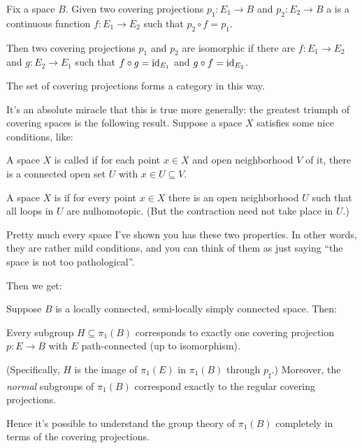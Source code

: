 \begin{definition}
	Fix a space $B$.
	Given two covering projections $p_1 \colon E_1 \to B$ and $p_2 \colon E_2 \to B$
	a  is a continuous function $f \colon E_1 \to E_2$
	such that $p_2 \circ f = p_1$.
	\begin{center}
	\end{center}
	Then two covering projections $p_1$ and $p_2$ are isomorphic if there are
	$f \colon E_1 \to E_2$ and $g \colon E_2 \to E_1$
	such that $f \circ g = \mathrm{id}_{E_1}$ and $g \circ f = \mathrm{id}_{E_2}$.
\end{definition}
\begin{remark}
	The set of covering projections forms a category in this way.
\end{remark}

It's an absolute miracle that this is true more generally:
the greatest triumph of covering spaces is the following result.
Suppose a space $X$ satisfies some nice conditions, like:
\begin{definition}
	A space $X$ is called 
	if for each point $x \in X$ and open neighborhood $V$ of it,
	there is a connected open set $U$ with $x \in U \subseteq V$.
\end{definition}
\begin{definition}
	A space $X$ is 
	if for every point $x \in X$
	there is an open neighborhood $U$
	such that all loops in $U$ are nulhomotopic.
	(But the contraction need not take place in $U$.)
\end{definition}
\begin{example}
	Pretty much every space I've shown you has these two properties.
	In other words, they are rather mild conditions, and you can think of them as just
	saying ``the space is not too pathological''.
\end{example}
Then we get:
\begin{theorem}
	Suppose $B$ is a locally connected, semi-locally simply connected space.
	Then:
	\begin{itemize}
		\ii Every subgroup $H \subseteq \pi_1(B)$ corresponds
		to exactly one covering projection $p \colon E \to B$
		with $E$ path-connected (up to isomorphism).

		(Specifically, $H$ is the image of $\pi_1(E)$ in $\pi_1(B)$ through $p_\sharp$.)
		\ii Moreover, the \emph{normal} subgroups of $\pi_1(B)$
		correspond exactly to the regular covering projections.
	\end{itemize}
\end{theorem}
Hence it's possible to understand the group theory of $\pi_1(B)$ completely
in terms of the covering projections.

